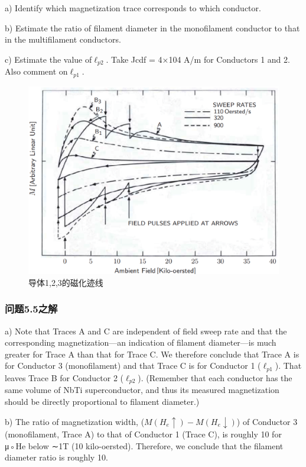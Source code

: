 a) Identify which magnetization trace corresponds to which conductor.

b) Estimate the ratio of filament diameter in the monofilament conductor to
that in the multifilament conductors.

c) Estimate the value of$\ell_{p2}$. Take Jcdf = 4×104 A/m for Conductors 1 and 2.
Also comment on$\ell_{p1}$.

\begin{figure}
	\centering
	\includegraphics[scale=0.4]{chpt5/figs/fig5.21.eps}
	\caption{导体1,2,3的磁化迹线}
\end{figure}


\subsubsection{问题5.5之解}
a) Note that Traces A and C are independent of field sweep rate and that the
corresponding magnetization—an indication of filament diameter—is much greater
for Trace A than that for Trace C. We therefore conclude that Trace A is for
Conductor 3 (monofilament) and that Trace C is for Conductor 1 ($\ell_{p1}$). That
leaves Trace B for Conductor 2 ($\ell_{p2}$). (Remember that each conductor has the
same volume of NbTi superconductor, and thus its measured magnetization should
be directly proportional to filament diameter.)

b) The ratio of magnetization width, ($M(H_e\uparrow) − M(H_e\downarrow)$) of Conductor 3
(monofilament, Trace A) to that of Conductor 1 (Trace C), is roughly 10 for μ◦He
below ∼1T (10 kilo-oersted). Therefore, we conclude that the filament diameter
ratio is roughly 10.

